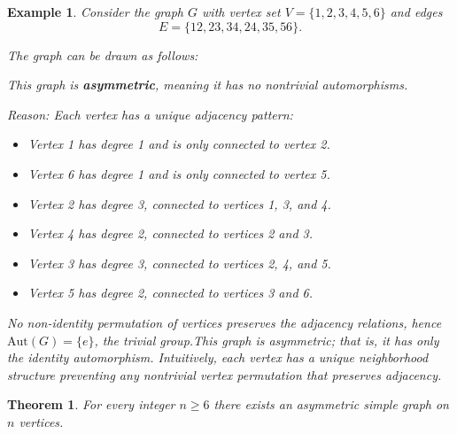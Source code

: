 \documentclass[12pt,a4paper,openany]{book}
\newtheorem{theorem}{Theorem}[section]
\newtheorem{example}{Example}[section]
\begin{document}
\begin{example}
Consider the graph \(G\) with vertex set \(V = \{1,2,3,4,5,6\}\) and edges
\[
E = \{12, 23, 34, 24, 35, 56\}.
\]

The graph can be drawn as follows:

\begin{center}
\end{center}

This graph is \textbf{asymmetric}, meaning it has no nontrivial automorphisms.

\textit{Reason:} Each vertex has a unique adjacency pattern:
\begin{itemize}
  \item Vertex 1 has degree 1 and is only connected to vertex 2.
  \item Vertex 6 has degree 1 and is only connected to vertex 5.
  \item Vertex 2 has degree 3, connected to vertices 1, 3, and 4.
  \item Vertex 4 has degree 2, connected to vertices 2 and 3.
  \item Vertex 3 has degree 3, connected to vertices 2, 4, and 5.
  \item Vertex 5 has degree 2, connected to vertices 3 and 6.
\end{itemize}

No non-identity permutation of vertices preserves the adjacency relations, hence \(\mathrm{Aut}(G) = \{e\}\), the trivial group.This graph is asymmetric; that is, it has only the identity automorphism. Intuitively, each vertex has a unique neighborhood structure preventing any nontrivial vertex permutation that preserves adjacency.
\end{example}

\begin{theorem}
For every integer $n\ge 6$ there exists an asymmetric simple graph on $n$ vertices.
\end{theorem}
\end{document}
